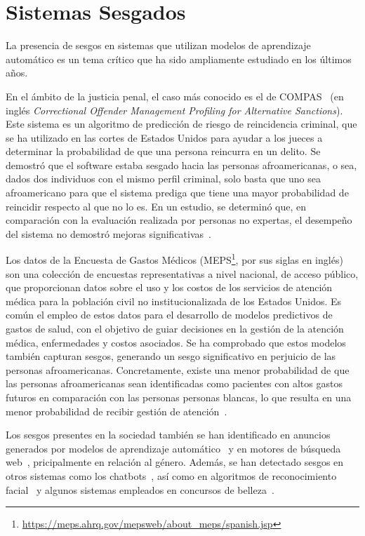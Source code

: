\section{Sistemas Sesgados}

    La presencia de sesgos en sistemas que utilizan modelos de aprendizaje autom\'atico es un tema cr\'itico que ha sido
    ampliamente estudiado en los \'ultimos a\~nos. 
    
    En el \'ambito de la justicia penal, el caso m\'as conocido es el de COMPAS~\parencite{propublica}
    (en ingl\'es \emph{Correctional Offender Management Profiling for Alternative Sanctions}). Este sistema es un algoritmo de predicci\'on
    de riesgo de reincidencia criminal, que se ha utilizado en las cortes de Estados Unidos para ayudar a los jueces a determinar la 
    probabilidad de que una persona reincurra en un delito. Se demostr\'o que el software estaba sesgado hacia las personas 
    afroamericanas, o sea, dados dos individuos con el mismo perfil criminal, solo basta que uno sea afroamericano para que el
    sistema prediga que tiene una mayor probabilidad de reincidir respecto al que no lo es. En un estudio, se determin\'o que, 
    en comparaci\'on con la evaluaci\'on realizada por personas no expertas, el desempe\~no del sistema no demostr\'o mejoras 
    significativas~\parencite{compas2}. 
    
    Los datos de la Encuesta de Gastos M\'edicos (MEPS\footnote{\url{https://meps.ahrq.gov/mepsweb/about_meps/spanish.jsp}}, 
    por sus siglas en ingl\'es) son una colecci\'on de encuestas representativas a nivel nacional, de acceso p\'ublico, que proporcionan 
    datos sobre el uso y los costos de los servicios de atenci\'on m\'edica para la poblaci\'on civil no institucionalizada de los Estados Unidos. 
    Es com\'un el empleo de estos datos para el desarrollo de modelos predictivos de gastos de salud, con el objetivo de guiar decisiones 
    en la gesti\'on de la atenci\'on m\'edica, enfermedades y costos asociados. Se ha comprobado que estos modelos tambi\'en capturan sesgos, 
    generando un sesgo significativo en perjuicio de las personas afroamericanas. Concretamente, existe una menor probabilidad de que 
    las personas afroamericanas sean identificadas como pacientes con altos gastos futuros en comparaci\'on con las personas personas blancas, 
    lo que resulta en una menor probabilidad de recibir gesti\'on de atenci\'on~\parencite{understanding}.

    Los sesgos presentes en la sociedad tambi\'en se han identificado en anuncios generados por modelos de aprendizaje 
    autom\'atico~\parencite{sweeney2013discrimination,datta2015automated} y en motores de b\'usqueda web~\parencite{unequal_rep}, 
    pricipalmente en relaci\'on al g\'enero. Adem\'as, se han detectado sesgos en otros sistemas como los 
    chatbots~\parencite{chatbot_bias}, as\'i como en algoritmos de reconocimiento facial~\parencite{facial_bias} y algunos 
    sistemas empleados en concursos de belleza~\parencite{beauty}.

